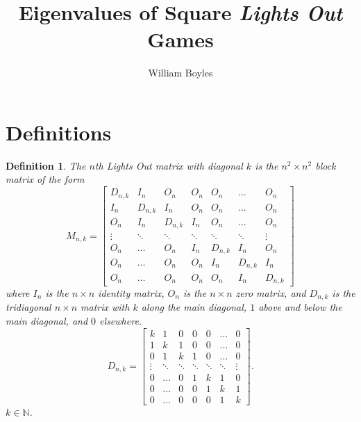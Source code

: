 \documentclass[12pt]{article}
\newtheorem{definition}{Definition}
\newcommand{\N}{\mathbb{N}}
\begin{document}
	\title{Eigenvalues of Square \textit{Lights Out} Games}
	\author{William Boyles}
	\maketitle
	
	\section{Definitions}
	\begin{definition}\label{def:matrix}
		The $n$th \textit{Lights Out} matrix with diagonal $k$ is the $n^2 \times n^2$
		block matrix of the form
		\begin{equation*}
		M_{n,k} = \begin{bmatrix}
		D_{n,k} & I_n & O_n & O_n & O_n & \ldots & O_n \\
		I_n & D_{n,k} & I_n & O_n & O_n & \ldots & O_n \\
		O_n & I_n & D_{n,k} & I_n & O_n & \ldots & O_n \\
		\vdots & \ddots & \ddots & \ddots & \ddots & \ddots & \vdots \\
		O_n & \ldots & O_n & I_n & D_{n,k} & I_n & O_n \\
		O_n & \ldots & O_n & O_n & I_n & D_{n,k} & I_n \\
		O_n & \ldots & O_n & O_n & O_n & I_n & D_{n,k}
		\end{bmatrix}
		\end{equation*}
		where $I_n$ is the $n \times n$ identity matrix, $O_n$ is the $n \times n$ zero
		matrix, and $D_{n,k}$ is the tridiagonal $n \times n$ matrix with $k$ along the
		main diagonal, $1$ above and below the main diagonal, and $0$ elsewhere.
		\begin{equation*}
		D_{n,k} = \begin{bmatrix}
		k & 1 & 0 & 0 & 0 & \ldots & 0 \\
		1 & k & 1 & 0 & 0 & \ldots & 0 \\
		0 & 1 & k & 1 & 0 & \ldots & 0 \\
		\vdots & \ddots & \ddots & \ddots & \ddots & \ddots & \vdots \\
		0 & \ldots & 0 & 1 & k & 1 & 0 \\
		0 & \ldots & 0 & 0 & 1 & k & 1 \\
		0 & \ldots & 0 & 0 & 0 & 1 & k
		\end{bmatrix}.
		\end{equation*}
		$k \in \N$.
	\end{definition}
	
\end{document}

